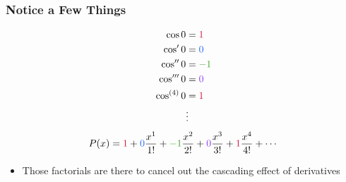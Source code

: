 \documentclass{beamer}
\begin{document}


\begin{frame}
  \frametitle{Notice a Few Things}
  \begin{align*}
    \cos 0 & = \textcolor{r}{1} \\
    \cos' 0 & = \textcolor{b}{0} \\
    \cos'' 0 & = \textcolor{g}{-1} \\
    \cos''' 0 & = \textcolor{p}{0} \\
    \cos^{(4)} 0 & = \textcolor{r}{1} \\
    & \vdots
  \end{align*}
  \begin{equation*}
    P(x) = \textcolor{r}{1} + \textcolor{b}{0}\frac{x^1}{1!} + \textcolor{g}{-1}\frac{x^2}{2!} + \textcolor{p}{0}\frac{x^3}{3!} + \textcolor{r}{1}\frac{x^4}{4!} + \cdots
  \end{equation*}
  \begin{itemize}
    \item Those factorials are there to cancel out the cascading effect of derivatives
  \end{itemize}
\end{frame}
\end{document}
